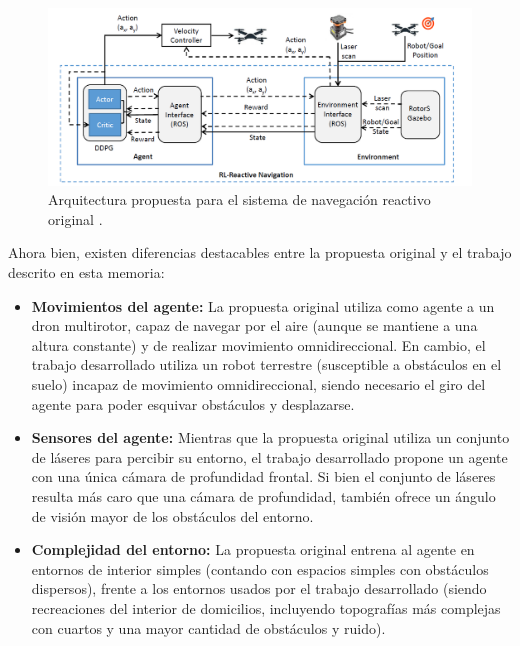\begin{figure}[h]
    \centering
    \includegraphics[width=\textwidth]{imagenes/cap2/drone-architecture.png}
    \caption{Arquitectura propuesta para el sistema de navegación reactivo original \cite{Sampedro2018}.}
    \label{fig:chap2-drone}
\end{figure}

Ahora bien, existen diferencias destacables entre la propuesta original y el trabajo descrito en esta memoria:

\begin{itemize}
	\item \textbf{Movimientos del agente:} La propuesta original utiliza como agente a un dron multirotor, capaz de navegar por el aire (aunque se mantiene a una altura constante) y de realizar movimiento omnidireccional. En cambio, el trabajo desarrollado utiliza un robot terrestre (susceptible a obstáculos en el suelo) incapaz de movimiento omnidireccional, siendo necesario el giro del agente para poder esquivar obstáculos y desplazarse.
	\item \textbf{Sensores del agente:} Mientras que la propuesta original utiliza un conjunto de láseres para percibir su entorno, el trabajo desarrollado propone un agente con una única cámara de profundidad frontal. Si bien el conjunto de láseres resulta más caro que una cámara de profundidad, también ofrece un ángulo de visión mayor de los obstáculos del entorno.
	\item \textbf{Complejidad del entorno:} La propuesta original entrena al agente en entornos de interior simples (contando con espacios simples con obstáculos dispersos), frente a los entornos usados por el trabajo desarrollado (siendo recreaciones del interior de domicilios, incluyendo topografías más complejas con cuartos y una mayor cantidad de obstáculos y ruido).
\end{itemize}

